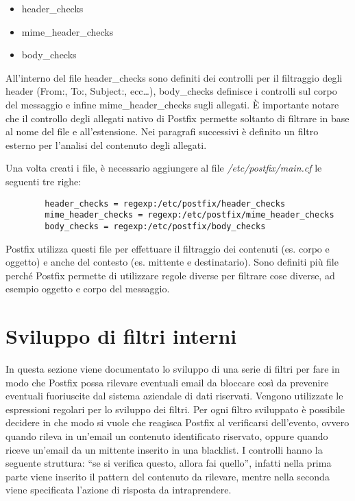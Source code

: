     \begin{itemize}
        \item header\_checks
        \item mime\_header\_checks
        \item body\_checks
    \end{itemize}

    All'interno del file header\_checks sono definiti dei controlli per il filtraggio degli header
    (From:, To:, Subject:, ecc\dots), body\_checks definisce i controlli sul corpo del messaggio e
    infine mime\_header\_checks sugli allegati. È importante notare che il controllo degli allegati
    nativo di Postfix permette soltanto di filtrare in base al nome del file e all'estensione. 
    Nei paragrafi successivi è definito un filtro esterno per l'analisi del contenuto degli allegati.

    Una volta creati i file, è necessario aggiungere al file \textit{/etc/postfix/main.cf} le seguenti tre righe:

    \begin{verbatim}
        header_checks = regexp:/etc/postfix/header_checks
        mime_header_checks = regexp:/etc/postfix/mime_header_checks
        body_checks = regexp:/etc/postfix/body_checks
    \end{verbatim}

    Postfix utilizza questi file per effettuare il filtraggio dei contenuti (es. corpo e oggetto) e anche del
    contesto (es. mittente e destinatario). Sono definiti più file perché Postfix permette di utilizzare regole 
    diverse per filtrare cose diverse, ad esempio oggetto e corpo del messaggio.

    \section{Sviluppo di filtri interni}
    In questa sezione viene documentato lo sviluppo di una serie di filtri per fare in modo che Postfix possa 
    rilevare eventuali email da bloccare così da prevenire eventuali fuoriuscite dal sistema aziendale di dati riservati. 
    Vengono utilizzate le espressioni regolari per lo sviluppo dei filtri. Per ogni filtro sviluppato è possibile 
    decidere in che modo si vuole che reagisca Postfix al verificarsi dell’evento, 
    ovvero quando rileva in un’email un contenuto identificato riservato, oppure quando riceve un’email da un 
    mittente inserito in una blacklist.
    I controlli hanno la seguente struttura: “se si verifica questo, allora fai quello”, 
    infatti nella prima parte viene inserito il pattern del contenuto da rilevare, mentre nella seconda viene 
    specificata l’azione di risposta da intraprendere.

